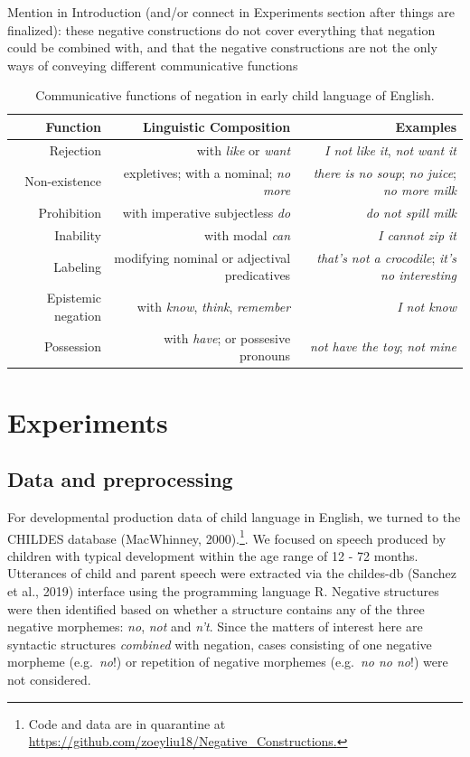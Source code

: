 \documentclass[10pt, letterpaper]{article}
\begin{document}
Mention in Introduction (and/or connect in Experiments section after
things are finalized): these negative constructions do not cover
everything that negation could be combined with, and that the negative
constructions are not the only ways of conveying different communicative
functions

\begin{table}[h]
\small
\centering
\begin{tabular}{rrr}
  \hline
 \textbf{Function} & \textbf{Linguistic Composition} & \textbf{Examples} \\
  \hline
Rejection & with \textit{like} or \textit{want} & \textit{I not like it}, \textit{not want it}  \\
Non-existence & expletives; with a nominal; \textit{no more} & \textit{there is no soup}; \textit{no juice}; \textit{no more milk} \\
Prohibition & with imperative subjectless \textit{do} & \textit{do not spill milk} \\
Inability & with modal \textit{can} & \textit{I cannot zip it} \\
Labeling & modifying nominal or adjectival predicatives & \textit{that's not a crocodile}; \textit{it's no interesting} \\
Epistemic negation & with \textit{know}, \textit{think}, \textit{remember}  & \textit{I not know} \\
Possession & with \textit{have}; or possesive pronouns & \textit{not have the toy}; \textit{not mine} \\
   \hline
\end{tabular}
\caption{Communicative functions of negation in early child language of English.}
\end{table}

\hypertarget{experiments}{%
\section{Experiments}\label{experiments}}

\hypertarget{data-and-preprocessing}{%
\subsection{Data and preprocessing}\label{data-and-preprocessing}}

For developmental production data of child language in English, we
turned to the CHILDES database (MacWhinney,
2000).\footnote{Code and data are in quarantine at \url{https://github.com/zoeyliu18/Negative_Constructions.}}.
We focused on speech produced by children with typical development
within the age range of 12 - 72 months. Utterances of child and parent
speech were extracted via the childes-db (Sanchez et al., 2019)
interface using the programming language R. Negative structures were
then identified based on whether a structure contains any of the three
negative morphemes: \emph{no}, \emph{not} and \emph{n't}. Since the
matters of interest here are syntactic structures \emph{combined} with
negation, cases consisting of one negative morpheme (e.g.~\emph{no}!) or
repetition of negative morphemes (e.g.~\emph{no no no}!) were not
considered.
\end{document}

